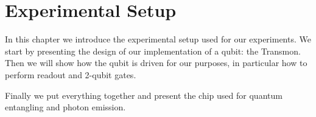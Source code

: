 \chapter{Experimental Setup}
\label{Chap:experimental}

In this chapter we introduce the experimental setup used for our experiments.
We start by presenting the design of our implementation of a qubit: the Transmon.
Then we will show how the qubit is driven for our purposes, in particular how to perform readout and 2-qubit gates.

Finally we put everything together and present the chip used for quantum entangling and photon emission.




